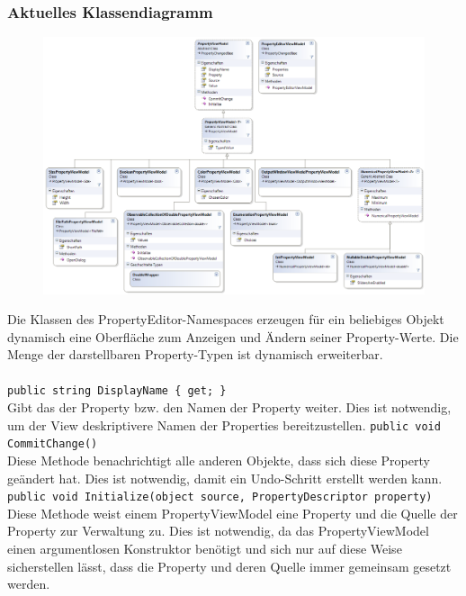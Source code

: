 \subsubsection*{Aktuelles Klassendiagramm}
\begin{figure}[h!]
\begin{center}
\includegraphics[width=\textwidth]{classdiagram/propertyeditorvm.png}
\end{center}
\end{figure}
Die Klassen des PropertyEditor-Namespaces erzeugen für ein beliebiges Objekt dynamisch eine Oberfläche zum Anzeigen und Ändern seiner Property-Werte. Die Menge der darstellbaren Property-Typen ist dynamisch erweiterbar.
\newpage

\paragraph{}
\begin{itemize}
	\add \verb!public string DisplayName { get; }! \\
	Gibt das  der Property bzw. den Namen der Property weiter. Dies ist notwendig, um der View deskriptivere Namen der Properties bereitzustellen.
	\add \verb!public void CommitChange()! \\
	Diese Methode benachrichtigt alle anderen Objekte, dass sich diese Property geändert hat. Dies ist notwendig, damit ein Undo-Schritt erstellt werden kann.
	\add \verb!public void Initialize(object source, PropertyDescriptor property)! \\
	Diese Methode weist einem PropertyViewModel eine Property und die Quelle der Property zur Verwaltung zu. Dies ist notwendig, da das PropertyViewModel einen argumentlosen Konstruktor benötigt und sich nur auf diese Weise sicherstellen lässt, dass die Property und deren Quelle immer gemeinsam gesetzt werden.
\end{itemize}

